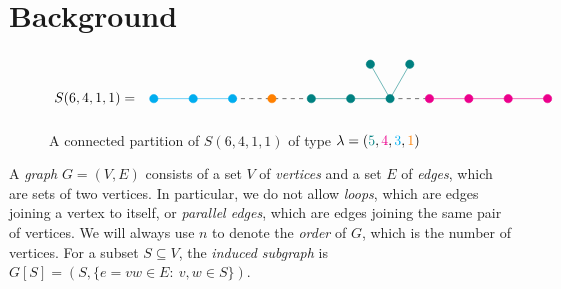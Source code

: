 \documentclass[12pt]{amsart}  %
\theoremstyle{definition}
\theoremstyle{remark}
\numberwithin{equation}{section}
\begin{document}
\section{Background}\label{section:background}

\begin{figure}
\caption{\label{fig:conpar} A connected partition of $S(6,4,1,1)$ of type $\lambda=(\textcolor{teal}5,\textcolor{magenta}4,\textcolor{cyan}3,\textcolor{orange}1)$}$$
\begin{tikzpicture}
\draw [dashed] (2,0)--(4,0) (6,0)--(7,0);
\node at (-1.5,0) {$S(6,4,1,1)=$};
\filldraw (0,0) [color=cyan] circle (3pt) node[align=center,below] (1){};
\filldraw (1,0) [color=cyan] circle (3pt) node[align=center,below] (2){};
\filldraw (2,0) [color=cyan] circle (3pt) node[align=center,below] (3){};
\filldraw (3,0) [color=orange] circle (3pt) node[align=center,below] (4){};
\filldraw (4,0) [color=teal]circle (3pt) node[align=center,below] (5){};
\filldraw (5,0) [color=teal]circle (3pt) node[align=center,below] (6){};
\filldraw (5.5,0.866) [color=teal] circle (3pt) node[align=center,above] (7){};
\filldraw (6,0) [color=teal] circle (3pt) node[align=center,below] (8){};
\filldraw (6.5,0.866) [color=teal]circle (3pt) node[align=center,above] (9){};
\filldraw (7,0) [color=magenta]circle (3pt) node[align=center,below] (10){};
\filldraw (8,0) [color=magenta]circle (3pt) node[align=center,below] (11){};
\filldraw (9,0) [color=magenta]circle (3pt) node[align=center,below] (12){};
\filldraw (10,0) [color=magenta]circle (3pt) node[align=center,below] (13){};
\draw [color=cyan](0,0)--(2,0);
\draw [color=teal] (4,0)--(6,0) (6,0)--(5.5,0.866) (6,0)--(6.5,0.866);
\draw[color=magenta] (7,0)--(10,0);
\end{tikzpicture}$$\end{figure}

A \emph{graph} $G=(V,E)$ consists of a set $V$ of \emph{vertices} and a set $E$ of \emph{edges}, which are sets of two vertices. In particular, we do not allow \emph{loops}, which are edges joining a vertex to itself, or \emph{parallel edges}, which are edges joining the same pair of vertices. We will always use $n$ to denote the \emph{order} of $G$, which is the number of vertices. For a subset $S\subseteq V$, the \emph{induced subgraph} is $G[S]=(S,\{e=vw\in E: \ v,w\in S\})$.
\end{document}
